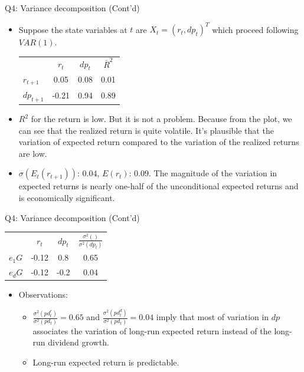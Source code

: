 \documentclass[10pt,t]{beamer}
\begin{document}
\begin{frame}{Q4: Variance decomposition (Cont'd)}
\begin{itemize}
  \item Suppose the state variables at $t$ are $X_t = (r_t, dp_t)^T$ which proceed following $VAR(1)$.
\begin{table}
\begin{tabular}{lccc}
\toprule
& $r_t$ & $dp_t$ & $\bar{R}^2$ \\
\cmidrule{1-4}
$r_{t+1}$ & 0.05 & 0.08 & 0.01 \\
$dp_{t+1}$ & -0.21 & 0.94 & 0.89 \\
\bottomrule
\end{tabular}
\end{table}
  \item $R^2$ for the return is low. But it is not a problem. Because from the plot, we can see that the realized return is quite volatile. It's plausible that the variation of expected return compared to the variation of the realized returns are low.
  \item $\sigma(E_{t}(r_{t+1}))$: $0.04$, $E(r_t)$: $0.09$. The magnitude of the variation in expected returns is nearly one-half of the unconditional expected returns and is economically significant.
\end{itemize}
\end{frame}


\begin{frame}{Q4: Variance decomposition (Cont'd)}
\begin{table}
\begin{tabular}{lccc}
\toprule
& $r_t$ & $dp_t$ & $\frac{\sigma^2()}{\sigma^2(dp_t)}$ \\
\cmidrule{1-4}
$e_1G$ & -0.12 & 0.8 & 0.65 \\
$e_dG$ & -0.12 & -0.2 & 0.04 \\
\bottomrule
\end{tabular}
\end{table}
\begin{itemize}
  \item Observations:
  \begin{itemize}
    \item $\frac{\sigma^2(pd^r_{t})}{\sigma^2(pd_t)} = 0.65$ and $\frac{\sigma^2(pd^d_{t})}{\sigma^2(pd_t)} = 0.04$ imply that most of variation in $dp$ associates the variation of long-run expected return instead of the long-run dividend growth.
    \item Long-run expected return is predictable.
  \end{itemize}
\end{itemize}
\end{frame}
\end{document}
